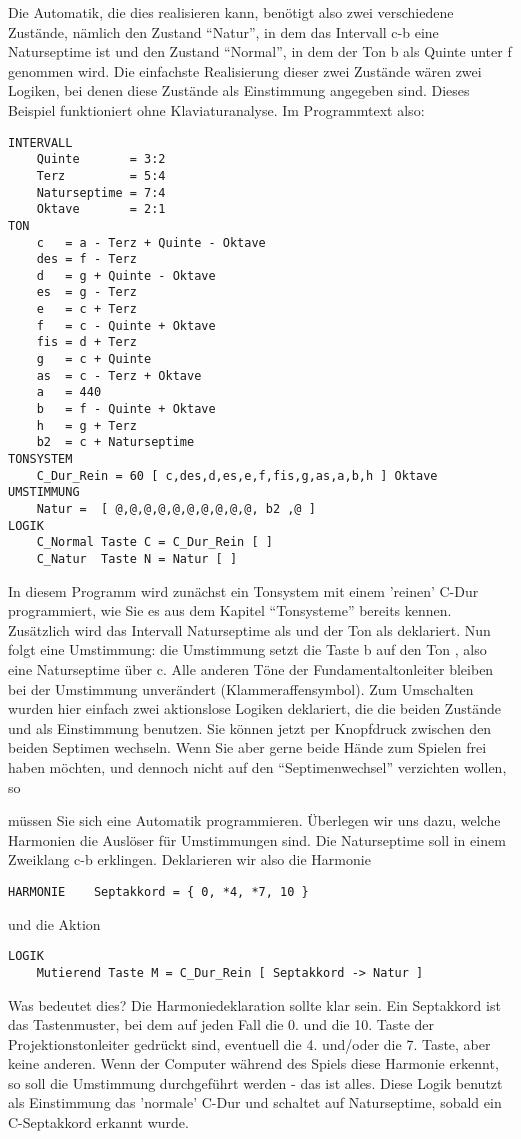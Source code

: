 Die Automatik, die dies realisieren kann, benötigt also zwei
verschiedene Zustände, nämlich den Zustand "`Natur"', in dem das
Intervall c-b eine Naturseptime ist und den Zustand "`Normal"', in
dem der Ton b als Quinte unter f genommen wird.
Die einfachste Realisierung dieser zwei Zustände wären zwei
Logiken, bei denen diese Zustände als Einstimmung angegeben sind.
Dieses Beispiel funktioniert ohne Klaviaturanalyse.
Im Programmtext also:
\begin{verbatim}
INTERVALL
    Quinte       = 3:2
    Terz         = 5:4
    Naturseptime = 7:4
    Oktave       = 2:1
TON
    c   = a - Terz + Quinte - Oktave
    des = f - Terz
    d   = g + Quinte - Oktave
    es  = g - Terz
    e   = c + Terz
    f   = c - Quinte + Oktave
    fis = d + Terz
    g   = c + Quinte
    as  = c - Terz + Oktave
    a   = 440
    b   = f - Quinte + Oktave
    h   = g + Terz
    b2  = c + Naturseptime
TONSYSTEM
    C_Dur_Rein = 60 [ c,des,d,es,e,f,fis,g,as,a,b,h ] Oktave
UMSTIMMUNG
    Natur =  [ @,@,@,@,@,@,@,@,@,@, b2 ,@ ]
LOGIK
    C_Normal Taste C = C_Dur_Rein [ ]
    C_Natur  Taste N = Natur [ ]
\end{verbatim}
In diesem Programm wird zunächst ein Tonsystem mit einem 'reinen'
C-Dur programmiert, wie Sie es aus dem Kapitel "`Tonsysteme"'
bereits kennen. Zusätzlich wird das Intervall Naturseptime als 
und der Ton  als  deklariert. Nun folgt eine
Umstimmung: die Umstimmung  setzt die Taste b auf den Ton
, also eine Naturseptime über c. Alle anderen Töne der Fundamentaltonleiter
bleiben bei der Umstimmung unverändert (Klammeraffensymbol).
Zum Umschalten wurden hier einfach zwei aktionslose Logiken
deklariert, die die beiden Zustände  und  als
Einstimmung benutzen. Sie können jetzt per Knopfdruck
zwischen den beiden Septimen wechseln.
Wenn Sie aber gerne beide Hände zum Spielen frei haben möchten,
und dennoch nicht auf den "`Septimenwechsel"' verzichten wollen, so

müssen Sie sich eine Automatik programmieren.
Überlegen wir uns dazu, welche Harmonien die Auslöser für
Umstimmungen sind.
Die Naturseptime soll in einem Zweiklang c-b erklingen.
Deklarieren wir also die Harmonie
\begin{verbatim}
HARMONIE    Septakkord = { 0, *4, *7, 10 }
\end{verbatim}
und die Aktion
\begin{verbatim}
LOGIK
    Mutierend Taste M = C_Dur_Rein [ Septakkord -> Natur ]
\end{verbatim}
Was bedeutet dies? Die Harmoniedeklaration sollte klar sein. Ein
Septakkord ist das Tastenmuster, bei dem auf jeden Fall die 0. und
die 10. Taste der Projektionstonleiter gedrückt sind, eventuell
die 4. und/oder die 7. Taste, aber keine anderen. Wenn der
Computer während des Spiels diese Harmonie erkennt, so soll die
Umstimmung  durchgeführt werden - das ist alles.
Diese Logik benutzt als Einstimmung das 'normale' C-Dur und
schaltet auf Naturseptime, sobald ein C-Septakkord erkannt wurde.

